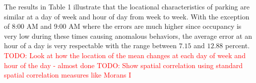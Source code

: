 \documentclass{article}
\begin{document}
\noindent
The results in Table 1 illustrate that the locational characteristics of parking are similar at a day of week and hour of day from week to week. With the exception of 8:00 AM and 9:00 AM where the errors are much higher since occupancy is very low during these times causing anomalous behaviors, the average error at an hour of a day is very respectable with the range between $7.15$ and $12.88$ percent.
\newline
\newline
\textcolor{red}{TODO: Look at how the location of the mean changes at each day of week and hour of the day - almost done}
\newline
\newline
\textcolor{red}{TODO: Show spatial correlation using standard spatial correlation measures like Morans I}



\end{document}

